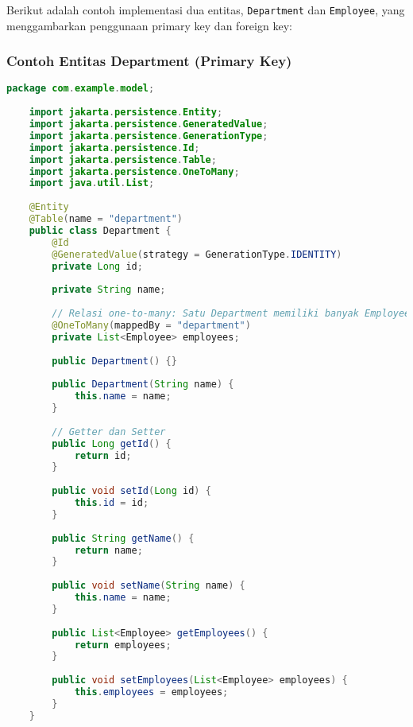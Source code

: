 Berikut adalah contoh implementasi dua entitas, \texttt{Department} dan \texttt{Employee}, yang menggambarkan penggunaan primary key dan foreign key:

\subsubsection*{Contoh Entitas Department (Primary Key)}
\begin{lstlisting}[language=Java, style=JavaStyle]
	package com.example.model;
	
	import jakarta.persistence.Entity;
	import jakarta.persistence.GeneratedValue;
	import jakarta.persistence.GenerationType;
	import jakarta.persistence.Id;
	import jakarta.persistence.Table;
	import jakarta.persistence.OneToMany;
	import java.util.List;
	
	@Entity
	@Table(name = "department")
	public class Department {
		@Id
		@GeneratedValue(strategy = GenerationType.IDENTITY)
		private Long id;
		
		private String name;
		
		// Relasi one-to-many: Satu Department memiliki banyak Employee
		@OneToMany(mappedBy = "department")
		private List<Employee> employees;
		
		public Department() {}
		
		public Department(String name) {
			this.name = name;
		}
		
		// Getter dan Setter
		public Long getId() {
			return id;
		}
		
		public void setId(Long id) {
			this.id = id;
		}
		
		public String getName() {
			return name;
		}
		
		public void setName(String name) {
			this.name = name;
		}
		
		public List<Employee> getEmployees() {
			return employees;
		}
		
		public void setEmployees(List<Employee> employees) {
			this.employees = employees;
		}
	}
\end{lstlisting}

